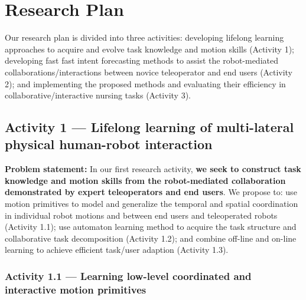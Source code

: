 \documentclass[letterpaper, 11 pt, onecolumn]{article}
\begin{document}
\section{Research Plan}\label{sec:plan}

Our research plan is divided into three activities: developing lifelong learning approaches to acquire and evolve task knowledge and motion skills (Activity 1); developing fast fast intent forecasting methods to assist the robot-mediated collaborations/interactions between novice teleoperator and end users (Activity 2); and implementing the proposed methods and evaluating their efficiency in collaborative/interactive nursing tasks (Activity 3).

\subsection{Activity 1 --- Lifelong learning of multi-lateral physical human-robot interaction}\label{sec:plan-motion}
\noindent


\noindent
{\bf Problem statement:} In our first research activity,
{\bf we seek to construct task knowledge and motion skills from the robot-mediated collaboration demonstrated by expert teleoperators and end users}. We propose to: use motion primitives to model and generalize the temporal and spatial coordination in individual robot motions and between end users and teleoperated robots (Activity 1.1); use automaton learning method to acquire the task structure and collaborative task decomposition (Activity 1.2); and combine off-line and on-line learning to achieve efficient task/user adaption (Activity 1.3). 

\subsubsection{Activity 1.1 --- Learning low-level coordinated and interactive motion primitives}\label{sec:plan-motion-low}
\end{document}
